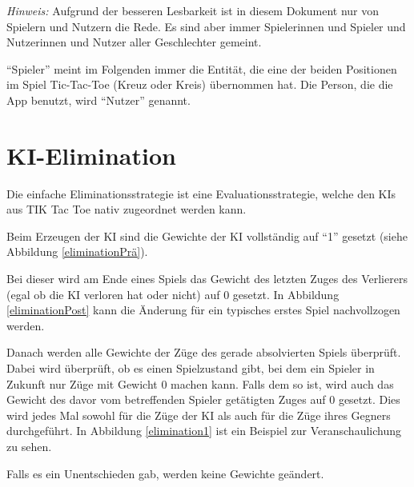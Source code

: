 \documentclass[titlepage]{scrartcl}
\title{\TicTacToe}
\subtitle{Dokumentation der Evaluationsstrategien}
\date{Stand: \today}
\author{Jonas, Luis, Leonid}
\newcommand{\TicTacToe}{TI\reflectbox K Tac Toe}
\begin{document}
\maketitle

\emph{Hinweis:} Aufgrund der besseren Lesbarkeit ist in diesem Dokument nur von Spielern und Nutzern die Rede.
Es sind aber immer Spielerinnen und Spieler und Nutzerinnen und Nutzer aller Geschlechter gemeint.

"`Spieler"' meint im Folgenden immer die Entität, die eine der beiden Positionen im Spiel Tic-Tac-Toe (Kreuz oder Kreis) übernommen hat.
Die Person, die die App benutzt, wird "`Nutzer"' genannt.
\section{KI-Elimination}
Die einfache Eliminationsstrategie ist eine Evaluationsstrategie, welche den KIs aus \TicTacToe{} nativ zugeordnet werden kann.

Beim Erzeugen der KI sind die Gewichte der KI vollständig auf "`1"' gesetzt (siehe Abbildung \ref{eliminationPrä}).

Bei dieser wird am Ende eines Spiels das Gewicht des letzten Zuges des Verlierers (egal ob die KI verloren hat oder nicht) auf \glqq{}0\grqq{} gesetzt.
In Abbildung \ref{eliminationPost} kann die Änderung für ein typisches erstes Spiel nachvollzogen werden.

Danach werden alle Gewichte der Züge des gerade absolvierten Spiels überprüft. Dabei wird überprüft, ob es einen Spielzustand gibt, bei dem ein Spieler in Zukunft nur Züge mit Gewicht 0 machen kann.
Falls dem so ist, wird auch das Gewicht des davor vom betreffenden Spieler getätigten Zuges auf \glqq{}0\grqq{} gesetzt.
Dies wird jedes Mal sowohl für die Züge der KI als auch für die Züge ihres Gegners durchgeführt.
In Abbildung \ref{elimination1} ist ein Beispiel zur Veranschaulichung zu sehen.

Falls es ein Unentschieden gab, werden keine Gewichte geändert. 
\end{document}
